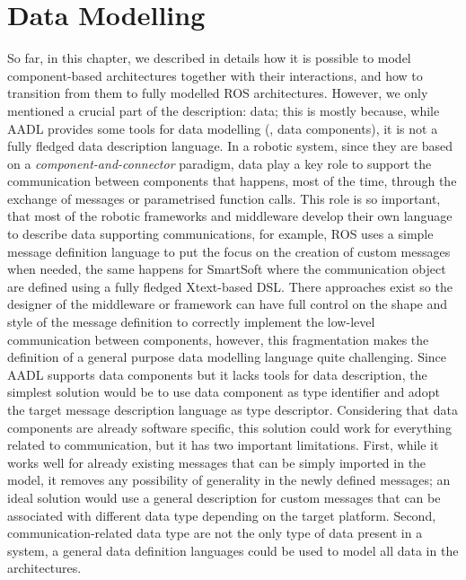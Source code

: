 \section{Data Modelling}
\label{sec:data}
So far, in this chapter, we described in details how it is possible to model component-based architectures together with their interactions, and how to transition from them to fully modelled ROS architectures. However, we only mentioned a crucial part of the description: data; this is mostly because, while AADL provides some tools for data modelling (\eg, data components), it is not a fully fledged data description language. In a robotic system, since they are based on a  \textit{component-and-connector} paradigm, data play a key role to support the communication between components that happens, most of the time, through the exchange of messages or parametrised function calls. This role is so important, that most of the robotic frameworks and middleware develop their own language to describe data supporting communications, for example, ROS uses a simple message definition language to put the focus on the creation of custom messages when needed, the same happens for SmartSoft where the communication object are defined using a fully fledged Xtext-based DSL. There approaches exist so the designer of the middleware or framework can have full control on the shape and style of the message definition to correctly implement the low-level communication between components, however, this fragmentation makes the definition of a general purpose data modelling language quite challenging. Since AADL supports data components but it lacks tools for data description, the simplest solution would be to use data component as type identifier and adopt the target message description language as type descriptor. Considering that data components are already software specific, this solution could work for everything related to communication, but it has two important limitations. First, while it works well for already existing messages that can be simply imported in the model, it removes any possibility of generality in the newly defined messages; an ideal solution would use a general description for custom messages that can be associated with different data type depending on the target platform. Second, communication-related data type are not the only type of data present in a system, a general data definition languages could be used to model all data in the architectures.

